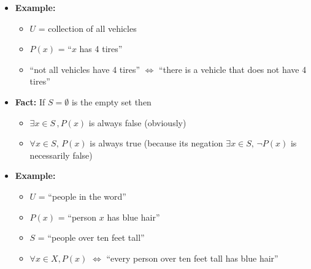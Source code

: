 \documentclass[11pt,twoside]{report}
\begin{document}
\begin{itemize}
\item \textbf{Example:} 
\begin{itemize}
\item $U$ = collection of all vehicles
\item $P(x)$ = ``$x$ has 4 tires''
\item ``not all vehicles have 4 tires'' $\iff$ ``there is a vehicle that does not have 4 tires''
\end{itemize}

\item \textbf{Fact:}  If $S = \emptyset$ is the empty set then %
\begin{itemize}
\item $\exists x \in S\, , P(x)$ is always false (obviously)
\item $\forall x \in S, \, P(x)$ is always  true (because its negation $\exists x \in S, \, \neg P(x)$ is necessarily false)
\end{itemize}





\item \textbf{Example:}  %
\begin{itemize}
\item $U$ = ``people in the word''
\item $P(x)$  = ``person $x$ has blue hair''
\item $S$ = ``people over ten feet tall''
\item $\forall x \in X, P(x)$  $\iff$   ``every person over ten feet tall has blue hair''


\end{itemize}



\end{itemize}
\end{document}
